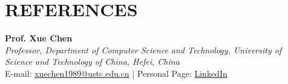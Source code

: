 \documentclass[a4paper,9pt]{extarticle}
\begin{document}


\section*{REFERENCES}

\textbf{Prof. Xue Chen}\\
\textit{Professor, Department of Computer Science and Technology, University of Science and Technology of China, Hefei, China}\\
E-mail: \href{mailto:xuechen1989@ustc.edu.cn}{xuechen1989@ustc.edu.cn} | Personal Page: \href{http://staff.ustc.edu.cn/~xuechen1989/}{LinkedIn} \\ \\
\end{document}
